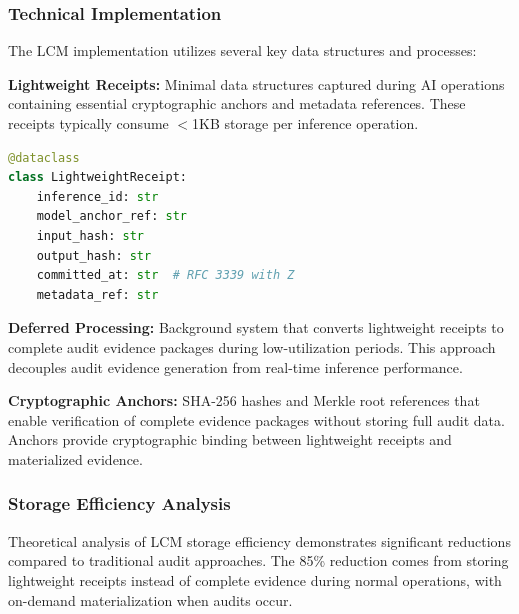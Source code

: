 \documentclass[12pt,a4paper]{article}
\begin{document}
\subsubsection{Technical Implementation}

The LCM implementation utilizes several key data structures and processes:

\textbf{Lightweight Receipts:} Minimal data structures captured during AI operations containing essential cryptographic anchors and metadata references. These receipts typically consume $<$1KB storage per inference operation.

\begin{lstlisting}[language=Python, caption=Lightweight Receipt Data Structure]
@dataclass
class LightweightReceipt:
    inference_id: str
    model_anchor_ref: str
    input_hash: str
    output_hash: str
    committed_at: str  # RFC 3339 with Z
    metadata_ref: str
\end{lstlisting}

\begin{center}
\end{center}

\textbf{Deferred Processing:} Background system that converts lightweight receipts to complete audit evidence packages during low-utilization periods. This approach decouples audit evidence generation from real-time inference performance.

\textbf{Cryptographic Anchors:} SHA-256 hashes and Merkle root references that enable verification of complete evidence packages without storing full audit data. Anchors provide cryptographic binding between lightweight receipts and materialized evidence.

\subsubsection{Storage Efficiency Analysis}

Theoretical analysis of LCM storage efficiency demonstrates significant reductions compared to traditional audit approaches. The 85\% reduction comes from storing lightweight receipts instead of complete evidence during normal operations, with on-demand materialization when audits occur.
\end{document}

